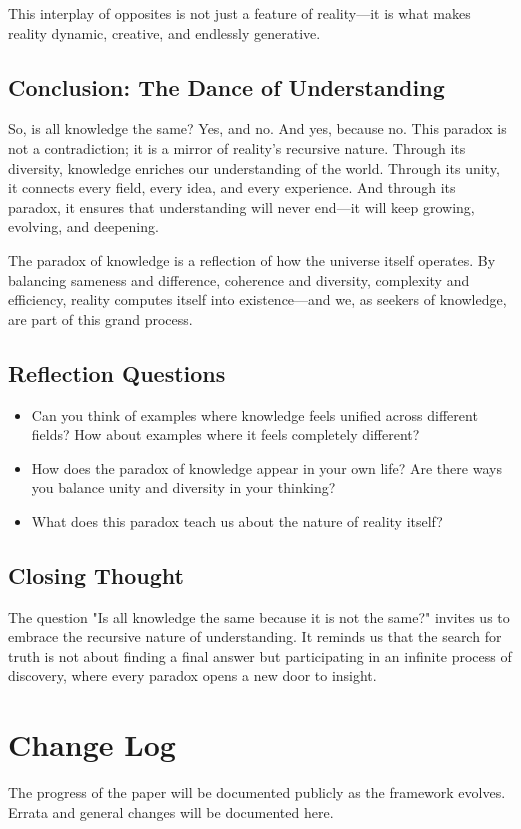 \documentclass[12pt]{article}
\begin{document}
This interplay of opposites is not just a feature of reality—it is what makes reality dynamic, creative, and endlessly generative.

\subsection*{Conclusion: The Dance of Understanding}
So, is all knowledge the same? Yes, and no. And yes, because no. This paradox is not a contradiction; it is a mirror of reality's recursive nature. Through its diversity, knowledge enriches our understanding of the world. Through its unity, it connects every field, every idea, and every experience. And through its paradox, it ensures that understanding will never end—it will keep growing, evolving, and deepening.

The paradox of knowledge is a reflection of how the universe itself operates. By balancing sameness and difference, coherence and diversity, complexity and efficiency, reality computes itself into existence—and we, as seekers of knowledge, are part of this grand process.

\subsection*{Reflection Questions}
\begin{itemize}
    \item Can you think of examples where knowledge feels unified across different fields? How about examples where it feels completely different?
    \item How does the paradox of knowledge appear in your own life? Are there ways you balance unity and diversity in your thinking?
    \item What does this paradox teach us about the nature of reality itself?
\end{itemize}

\subsection*{Closing Thought}
The question "Is all knowledge the same because it is not the same?" invites us to embrace the recursive nature of understanding. It reminds us that the search for truth is not about finding a final answer but participating in an infinite process of discovery, where every paradox opens a new door to insight.


\section{Change Log}
The progress of the paper will be documented publicly as the framework evolves. Errata and general changes will be documented here.
\end{document}
